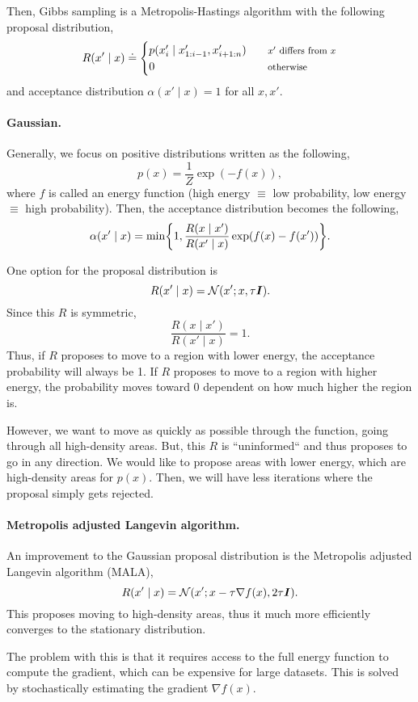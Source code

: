 Then, Gibbs sampling is a Metropolis-Hastings algorithm with the following
proposal distribution, \[
    R(x'\mid x) \doteq
    \begin{cases}
        p(x'_i \mid x'_{1:i-1}, x'_{i+1:n}) & \text{\footnotesize $x'$ differs from $x$} \\
        0                                   & \text{\footnotesize otherwise}
    \end{cases}
\]
and acceptance distribution $\alpha(x'\mid x) = 1$ for all $x,x'$.

\paragraph{Gaussian.}

Generally, we focus on positive distributions written as the following, \[
    p(x) = \frac{1}{Z} \exp (-f(x)),
\]
where $f$ is called an energy function (high energy $\equiv$ low probability,
low energy $\equiv$ high probability). Then, the acceptance distribution
becomes the following, \[
    \alpha(x'\mid x) = \min \lft\{ 1, \frac{R(x\mid x')}{R(x'\mid x)}\exp(f(x) - f(x')) \rgt\}.
\]

One option for the proposal distribution is \[
    R(x'\mid x) = \mathcal{N}(x'; x,\tau\bm{I}).
\]
Since this $R$ is symmetric, \[
    \frac{R(x\mid x')}{R(x'\mid x)} = 1.
\]
Thus, if $R$ proposes to move to a region with lower energy, the acceptance
probability will always be 1. If $R$ proposes to move to a region with higher
energy, the probability moves toward 0 dependent on how much higher the
region is.

However, we want to move as quickly as possible through the function, going
through all high-density areas. But, this $R$ is ``uninformed`` and thus
proposes to go in any direction. We would like to propose areas with lower
energy, which are high-density areas for $p(x)$. Then, we will have less
iterations where the proposal simply gets rejected.

\paragraph{Metropolis adjusted Langevin algorithm.}

An improvement to the Gaussian proposal distribution is the Metropolis
adjusted Langevin algorithm (MALA), \[
    R(x'\mid x) = \mathcal{N}(x'; x-\tau\nabla f(x),2\tau\bm{I}).
\]
This proposes moving to high-density areas, thus it much more efficiently
converges to the stationary distribution.

The problem with this is that it requires access to the full energy function to
compute the gradient, which can be expensive for large datasets. This is solved
by stochastically estimating the gradient $\nabla f(x)$.
